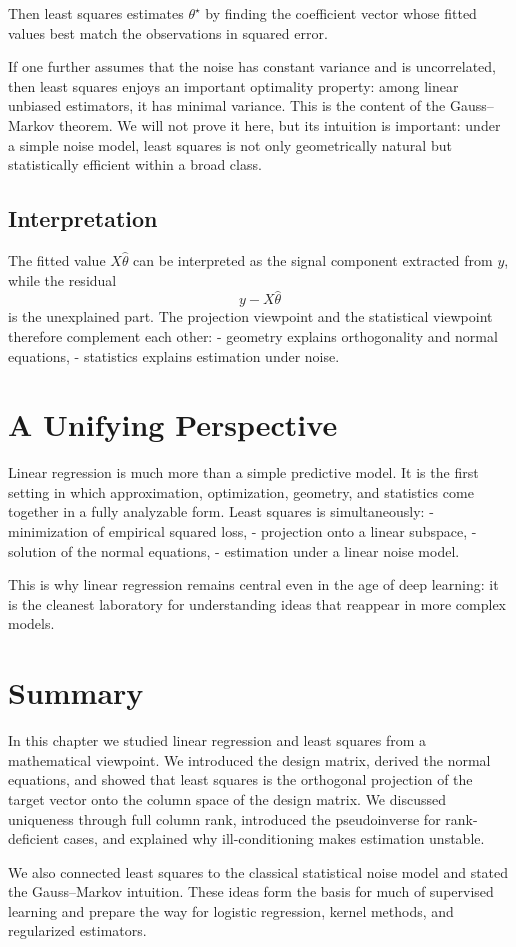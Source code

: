 Then least squares estimates $\theta^\star$ by finding the coefficient vector whose fitted values best match the observations in squared error.

If one further assumes that the noise has constant variance and is uncorrelated, then least squares enjoys an important optimality property: among linear unbiased estimators, it has minimal variance. This is the content of the Gauss--Markov theorem. We will not prove it here, but its intuition is important: under a simple noise model, least squares is not only geometrically natural but statistically efficient within a broad class.

\subsection{Interpretation}

The fitted value $X\hat\theta$ can be interpreted as the signal component extracted from $y$, while the residual
\[
y-X\hat\theta
\]
is the unexplained part. The projection viewpoint and the statistical viewpoint therefore complement each other:
- geometry explains orthogonality and normal equations,
- statistics explains estimation under noise.

\section{A Unifying Perspective}

Linear regression is much more than a simple predictive model. It is the first setting in which approximation, optimization, geometry, and statistics come together in a fully analyzable form. Least squares is simultaneously:
- minimization of empirical squared loss,
- projection onto a linear subspace,
- solution of the normal equations,
- estimation under a linear noise model.

This is why linear regression remains central even in the age of deep learning: it is the cleanest laboratory for understanding ideas that reappear in more complex models.

\section{Summary}

In this chapter we studied linear regression and least squares from a mathematical viewpoint. We introduced the design matrix, derived the normal equations, and showed that least squares is the orthogonal projection of the target vector onto the column space of the design matrix. We discussed uniqueness through full column rank, introduced the pseudoinverse for rank-deficient cases, and explained why ill-conditioning makes estimation unstable.

We also connected least squares to the classical statistical noise model and stated the Gauss--Markov intuition. These ideas form the basis for much of supervised learning and prepare the way for logistic regression, kernel methods, and regularized estimators.